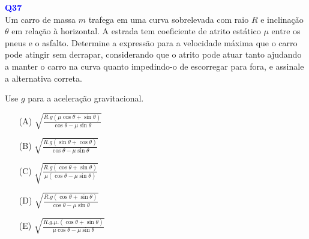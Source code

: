 \documentclass[a4paper,12pt]{article}
\begin{document}
\begin{flushleft}
\textbf{\textcolor{blue}{\Large Q37}}\\

Um carro de massa \( m \) trafega em uma curva sobrelevada com raio \( R \) e inclinação \(\theta\) em relação à horizontal. 
A estrada tem coeficiente de atrito estático \(\mu\) entre os pneus e o asfalto. Determine a expressão para a velocidade 
máxima que o carro pode atingir sem derrapar, considerando que o atrito pode atuar tanto ajudando a manter o carro na curva 
quanto impedindo-o de escorregar para fora, e assinale a alternativa correta.

Use \( g \) para a aceleração gravitacional.

\begin{itemize}
\item[(A)] $\sqrt{\frac{R.g\left(\mu\cos\theta +\sin\theta\right)}{\cos\theta - \mu\sin\theta}}$
\item[(B)] $\sqrt{\frac{R.g\left(\sin\theta + \cos\theta\right)}{\cos\theta - \mu\sin\theta}}$  
\item[(C)] $\sqrt{\frac{R.g\left(\cos\theta +\sin\theta\right)}{\mu\left(\cos\theta - \mu\sin\theta\right)}}$
\item[(D)] $\sqrt{\frac{R.g\left(\cos\theta +\sin\theta\right)}{\cos\theta - \mu\sin\theta}}$
\item[(E)] $\sqrt{\frac{R.g.\mu.\left(\cos\theta +\sin\theta\right)}{\mu\cos\theta - \mu\sin\theta}}$
\end{itemize}

\vspace{0.5cm}

\begin{center}
\end{center}
\end{flushleft}
\end{document}
